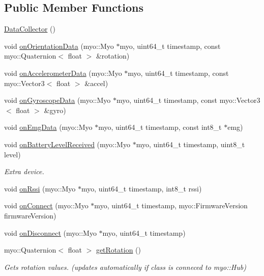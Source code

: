 \subsection*{Public Member Functions}
\begin{DoxyCompactItemize}
\item 
\mbox{\hyperlink{class_data_collector_a6f7eccfdf026a83317c386a18d16397d}{Data\+Collector}} ()
\item 
void \mbox{\hyperlink{class_data_collector_a7e54df882eed064e4059b3361dff796f}{on\+Orientation\+Data}} (myo\+::\+Myo $\ast$myo, uint64\+\_\+t timestamp, const myo\+::\+Quaternion$<$ float $>$ \&rotation)
\item 
void \mbox{\hyperlink{class_data_collector_af284c1bda701eb04d8278848672a1be6}{on\+Accelerometer\+Data}} (myo\+::\+Myo $\ast$myo, uint64\+\_\+t timestamp, const myo\+::\+Vector3$<$ float $>$ \&accel)
\item 
void \mbox{\hyperlink{class_data_collector_a46ee5fda02554a8d84a0f449026dcfac}{on\+Gyroscope\+Data}} (myo\+::\+Myo $\ast$myo, uint64\+\_\+t timestamp, const myo\+::\+Vector3$<$ float $>$ \&gyro)
\item 
void \mbox{\hyperlink{class_data_collector_a43639de09ccb9c540a3d21d267e7460a}{on\+Emg\+Data}} (myo\+::\+Myo $\ast$myo, uint64\+\_\+t timestamp, const int8\+\_\+t $\ast$emg)
\item 
void \mbox{\hyperlink{class_data_collector_a56a6c61925d54439459fc1599f76c601}{on\+Battery\+Level\+Received}} (myo\+::\+Myo $\ast$myo, uint64\+\_\+t timestamp, uint8\+\_\+t level)
\begin{DoxyCompactList}\small\item\em Extra device. \end{DoxyCompactList}\item 
void \mbox{\hyperlink{class_data_collector_aff0d95e10b014c460bf859abd6a01f74}{on\+Rssi}} (myo\+::\+Myo $\ast$myo, uint64\+\_\+t timestamp, int8\+\_\+t rssi)
\item 
void \mbox{\hyperlink{class_data_collector_a8e6ee72005537474eb45f2a9310fa540}{on\+Connect}} (myo\+::\+Myo $\ast$myo, uint64\+\_\+t timestamp, myo\+::\+Firmware\+Version firmware\+Version)
\item 
void \mbox{\hyperlink{class_data_collector_a89d1d780cdf635c607707f90b0665d50}{on\+Disconnect}} (myo\+::\+Myo $\ast$myo, uint64\+\_\+t timestamp)
\item 
myo\+::\+Quaternion$<$ float $>$ \mbox{\hyperlink{class_data_collector_a46a7e8adb8679fde1021fe89ed0d0be0}{get\+Rotation}} ()
\begin{DoxyCompactList}\small\item\em Gets rotation values. (updates automatically if class is conneced to myo\+::\+Hub) \end{DoxyCompactList}\item 

\end{DoxyCompactItemize}
